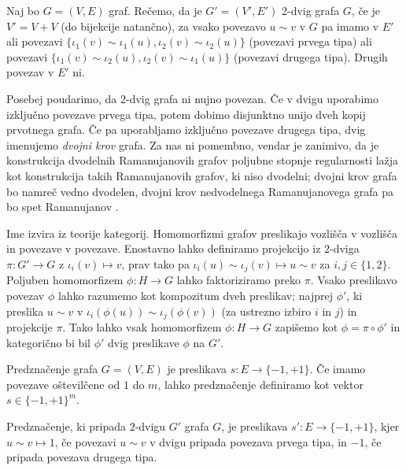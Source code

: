 \begin{definicija}
    Naj bo \(G = (V, E)\) graf. Rečemo, da je \(G'= (V', E')\) 2-dvig grafa \(G\), če je \(V' = V + V\) (do bijekcije natančno), za vsako povezavo \(u\sim v\) v \(G\) pa imamo v \(E'\) ali povezavi \(\{\iota_1(v)\sim \iota_1(u), \iota_2(v)\sim \iota_2(u)\}\) (povezavi prvega tipa) ali povezavi \(\{\iota_1(v)\sim \iota_2(u), \iota_2(v)\sim \iota_1(u)\}\) (povezavi drugega tipa). Drugih povezav v \(E'\) ni.
\end{definicija}

Posebej poudarimo, da \(2\)-dvig grafa ni nujno povezan. Če v dvigu uporabimo izključno povezave prvega tipa, potem dobimo disjunktno unijo dveh kopij prvotnega grafa. Če pa uporabljamo izključno povezave drugega tipa, dvig imenujemo \emph{dvojni krov} grafa. Za nas ni pomembno, vendar je zanimivo, da je konstrukcija dvodelnih Ramanujanovih grafov poljubne stopnje regularnosti lažja kot konstrukcija takih Ramanujanovih grafov, ki niso dvodelni; dvojni krov grafa bo namreč vedno dvodelen, dvojni krov nedvodelnega Ramanujanovega grafa pa bo spet Ramanujanov \cite{marcus2014interlacingfamiliesibipartite}.

Ime izvira iz teorije kategorij. Homomorfizmi grafov preslikajo vozlišča v vozlišča in povezave v povezave. Enostavno lahko definiramo projekcijo iz \(2\)-dviga \(\pi\colon G'\to G\) z \(\iota_i(v)\mapsto v\), prav tako pa \(\iota_i(u)\sim\iota_j(v)\mapsto u\sim v\) za \(i, j\in \{1,2\}\). Poljuben homomorfizem \(\phi\colon H\to G\) lahko faktoriziramo preko \(\pi\). Vsako preslikavo povezav \(\phi\) lahko razumemo kot kompozitum dveh preslikav; najprej \(\phi'\), ki preslika \(u\sim v\) v \(\iota_i(\phi(u)) \sim \iota_j(\phi(v))\) (za ustrezno izbiro \(i\) in \(j\)) in projekcije \(\pi\). Tako lahko vsak homomorfizem \(\phi\colon H\to G\) zapišemo kot \(\phi = \pi\circ \phi'\) in kategorično bi bil \(\phi'\) dvig preslikave \(\phi\) na \(G'\).

\begin{definicija}
    Predznačenje grafa \(G = (V, E)\) je preslikava \(s\colon E\to \{-1, +1\}\). Če imamo povezave oštevilčene od \(1\) do \(m\), lahko predznačenje definiramo kot vektor \(s\in \{-1, +1\}^m\).

    Predznačenje, ki pripada \(2\)-dvigu \(G'\) grafa \(G\), je preslikava \(s'\colon E \to \{-1, +1\}\), kjer \(u\sim v \mapsto 1\), če povezavi \(u\sim v\) v dvigu pripada povezava prvega tipa, in \(-1\), če pripada povezava drugega tipa.
\end{definicija}

